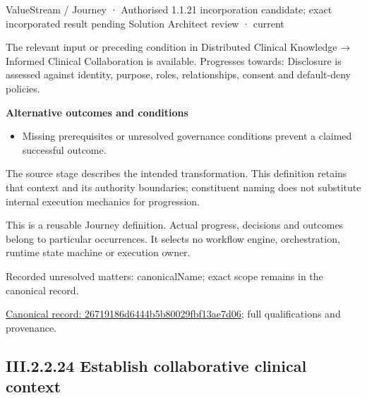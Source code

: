 \label{element:26719186d6444b5b80029fbf13ae7d06}
{\small ValueStream / Journey · Authorised 1.1.21 incorporation candidate; exact incorporated result pending Solution Architect review · current}\par

The relevant input or preceding condition in Distributed Clinical Knowledge → Informed Clinical Collaboration is available. Progresses towards: Disclosure is assessed against identity, purpose, roles, relationships, consent and default-deny policies.



\par\medskip\textbf{Alternative outcomes and conditions}\par


\begin{itemize}


\item Missing prerequisites or unresolved governance conditions prevent a claimed successful outcome.

\end{itemize}


The source stage describes the intended transformation. This definition retains that context and its authority boundaries; constituent naming does not substitute internal execution mechanics for progression.



This is a reusable Journey definition. Actual progress, decisions and outcomes belong to particular occurrences. It selects no workflow engine, orchestration, runtime state machine or execution owner.


{\small Recorded unresolved matters: canonicalName; exact scope remains in the canonical record.}\par
{\footnotesize \href{../../../../continuum/strategy/value-stream/26719186d6444b5b80029fbf13ae7d06.md}{Canonical record: 26719186d6444b5b80029fbf13ae7d06}; full qualifications and provenance.}\par
\subsection*{III.2.2.24 Establish collaborative clinical context}
\label{navigation:III.2.2.24}

